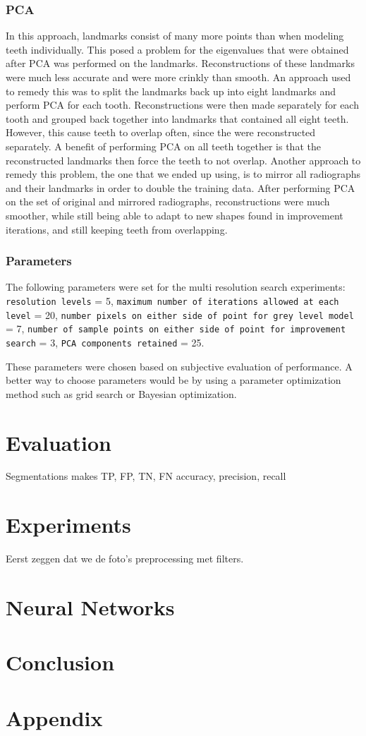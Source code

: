 \documentclass[a4paper]{article}
\begin{document}
\subsubsection{PCA}
In this approach, landmarks consist of many more points than when modeling teeth individually. This posed a problem for the eigenvalues that were obtained after PCA was performed on the landmarks. Reconstructions of these landmarks were much less accurate and were more crinkly than smooth. An approach used to remedy this was to split the landmarks back up into eight landmarks and perform PCA for each tooth. Reconstructions were then made separately for each tooth and grouped back together into landmarks that contained all eight teeth. However, this cause teeth to overlap often, since the were reconstructed separately. A benefit of performing PCA on all teeth together is that the reconstructed landmarks then force the teeth to not overlap. Another approach to remedy this problem, the one that we ended up using, is to mirror all radiographs and their landmarks in order to double the training data. After performing PCA on the set of original and mirrored radiographs, reconstructions were much smoother, while still being able to adapt to new shapes found in improvement iterations, and still keeping teeth from overlapping.

\subsubsection{Parameters}
The following parameters were set for the multi resolution search experiments: \texttt{resolution levels} = 5, \texttt{maximum number of iterations allowed at each level} = 20, \texttt{number pixels on either side of point for grey level model} = 7, \texttt{number of sample points on either side of point for improvement search} = 3, \texttt{PCA components retained} = 25. 

These parameters were chosen based on subjective evaluation of performance. A better way to choose parameters would be by using a parameter optimization method such as grid search or Bayesian optimization.


\section{Evaluation}
\label{sect:evaluation}
Segmentations makes
TP, FP, TN, FN
accuracy, precision, recall


\section{Experiments}
Eerst zeggen dat we de foto's preprocessing met filters.
\label{sect:experiments}
\section{Neural Networks}
\label{sect:nns}

\section{Conclusion}
\label{sect:conclusion}

\newpage
\section{Appendix}
\label{sect:appendix}




\end{document}
